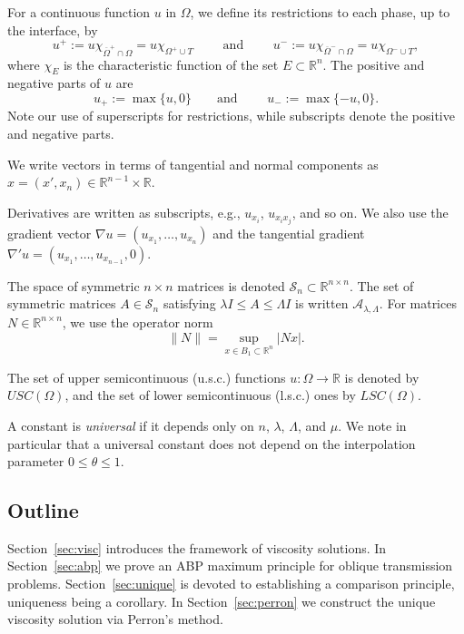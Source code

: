 \documentclass[letter,11pt]{amsart}
\newcommand{\R}{\mathbb{R}}
\newcommand{\chara}[1]{\chi_{#1}}
\newcommand{\id}{I}
\newcommand{\ellmat}{\mathcal{A}_{\lambda, \Lambda}}
\newcommand{\scal}{\mathcal{S}}
\newcommand{\uppers}{USC}
\newcommand{\lowers}{LSC}
\theoremstyle{definition}
\numberwithin{equation}{section}
\begin{document}
\medskip

For a continuous function $u$ in $\Omega$, we define its restrictions to each phase, up to the interface, by
\[
u^{+} := u \chara{\overline{\Omega}^{+} \cap \Omega} = u \chara{\Omega^{+} \cup T}
\qquad \text{ and } \qquad 
u^{-} := u \chara{\overline{\Omega}^{-} \cap \Omega} = u \chara{\Omega^{-} \cup T },
\]
where $\chara{E}$ is the characteristic function of the set $E \subset \R^{n}$.
The positive and negative parts of $u$ are
\[
u_{+} := \max\{u, 0\} \qquad \text{and } \qquad u_{-} := \max\{-u, 0\}.
\]
Note our use of superscripts for restrictions, while subscripts denote the positive and negative parts.

\medskip

We write vectors in terms of tangential and normal components as $x = (x', x_n) \in \R^{n-1} \times \R$.

\medskip

Derivatives are written as subscripts, e.g., $u_{x_i}$, $u_{x_i x_j}$, and so on.
We also use the gradient vector $\nabla u = (u_{x_1}, \ldots, u_{x_n})$
and the tangential gradient $\nabla' u = (u_{x_1}, \ldots, u_{x_{n-1}}, 0)$.

\medskip

The space of symmetric $n \times n$ matrices is denoted $\scal_n \subset \R^{n\times n}$.
The set of symmetric matrices $A \in \scal_n$ satisfying $\lambda \id \leq A \leq \Lambda \id$ is written $\ellmat$. 
For matrices $N \in \R^{n\times n}$, we use the operator norm
\[
\|N\| = \sup_{x \in B_1 \subset \R^{n}} |N x|.
\]

The set of upper semicontinuous (u.s.c.) functions $u \colon \Omega \to \R$ is denoted by $\uppers(\Omega)$,
and the set of lower semicontinuous (l.s.c.) ones by $\lowers(\Omega)$.

\medskip

A constant is \emph{universal} if it depends only on $n$, $\lambda$, $\Lambda$, and $\mu$.
We note in particular that a universal constant does not depend on the interpolation parameter $0 \leq \theta \leq 1$.

\subsection{Outline}
Section~\ref{sec:visc} introduces the framework of viscosity solutions.
In Section~\ref{sec:abp} we prove an ABP maximum principle for oblique transmission problems.
Section~\ref{sec:unique} is devoted to establishing a comparison principle, uniqueness being a corollary.
In Section~\ref{sec:perron} we construct the unique viscosity solution via Perron's method.
\end{document}
